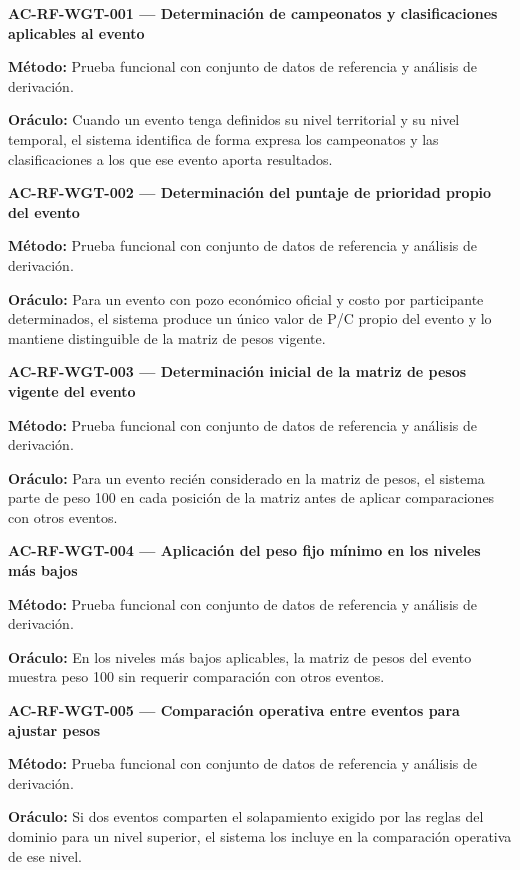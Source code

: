 \documentclass[10pt,letterpaper]{article}
\begin{document}
\noindent\textbf{AC-RF-WGT-001 --- Determinación de campeonatos y clasificaciones aplicables al evento}\par
\textbf{Método:} Prueba funcional con conjunto de datos de referencia y análisis de derivación.\par
\textbf{Oráculo:} Cuando un evento tenga definidos su nivel territorial y su nivel temporal, el sistema identifica de forma expresa los campeonatos y las clasificaciones a los que ese evento aporta resultados.\par\vspace{0.45em}
\noindent\textbf{AC-RF-WGT-002 --- Determinación del puntaje de prioridad propio del evento}\par
\textbf{Método:} Prueba funcional con conjunto de datos de referencia y análisis de derivación.\par
\textbf{Oráculo:} Para un evento con pozo económico oficial y costo por participante determinados, el sistema produce un único valor de P/C propio del evento y lo mantiene distinguible de la matriz de pesos vigente.\par\vspace{0.45em}
\noindent\textbf{AC-RF-WGT-003 --- Determinación inicial de la matriz de pesos vigente del evento}\par
\textbf{Método:} Prueba funcional con conjunto de datos de referencia y análisis de derivación.\par
\textbf{Oráculo:} Para un evento recién considerado en la matriz de pesos, el sistema parte de peso 100 en cada posición de la matriz antes de aplicar comparaciones con otros eventos.\par\vspace{0.45em}
\noindent\textbf{AC-RF-WGT-004 --- Aplicación del peso fijo mínimo en los niveles más bajos}\par
\textbf{Método:} Prueba funcional con conjunto de datos de referencia y análisis de derivación.\par
\textbf{Oráculo:} En los niveles más bajos aplicables, la matriz de pesos del evento muestra peso 100 sin requerir comparación con otros eventos.\par\vspace{0.45em}
\noindent\textbf{AC-RF-WGT-005 --- Comparación operativa entre eventos para ajustar pesos}\par
\textbf{Método:} Prueba funcional con conjunto de datos de referencia y análisis de derivación.\par
\textbf{Oráculo:} Si dos eventos comparten el solapamiento exigido por las reglas del dominio para un nivel superior, el sistema los incluye en la comparación operativa de ese nivel.\par\vspace{0.45em}
\end{document}
